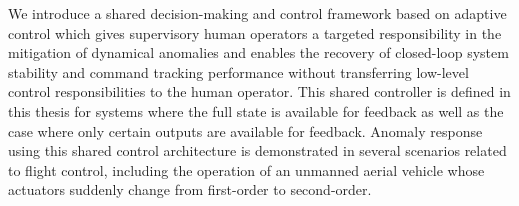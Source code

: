 We introduce a shared decision-making and control framework based on adaptive control which gives supervisory human operators a targeted responsibility in the mitigation of dynamical anomalies and enables the recovery of closed-loop system stability and command tracking performance without transferring low-level control responsibilities to the human operator. This shared controller is defined in this thesis for systems where the full state is available for feedback as well as the case where only certain outputs are available for feedback. Anomaly response using this shared control architecture is demonstrated in several scenarios related to flight control, including the operation of an unmanned aerial vehicle whose actuators suddenly change from first-order to second-order. 